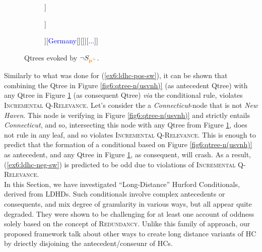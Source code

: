 \begin{figure}[H]
	\centering
	\begin{subfigure}[b]{.35\linewidth}
		\centering
		\begin{forest}
			[CS[{\textcolor{orange}{Connecticut}}][\fbox{\textcolor{orange}{$\neg$Connecticut}}]]
		\end{forest}
	\end{subfigure}	
	\begin{subfigure}[b]{.35\linewidth}
		\centering
		\begin{forest}
			[CS[\textcolor{orange}{Connecticut}][\fbox{\textcolor{orange}{Lower Saxony}}][\fbox{\textcolor{orange}{...}}]]
		\end{forest}
	\end{subfigure}
	\begin{subfigure}[b]{.35\linewidth}
		\centering
		\begin{forest}
			[CS[\textcolor{blue}{US}[\textcolor{orange}{Connecticut}][\fbox{\textcolor{orange}{...}}]][\textcolor{blue}{Germany}[\fbox{\textcolor{orange}{Lower Saxony}}][\fbox{\textcolor{orange}{...}}]][\textcolor{blue}{...}]]
		\end{forest}
	\end{subfigure}	
	\caption[]{Qtrees evoked by $\neg S_{\textbf{\textcolor{orange}{p$^+$}}}$.}\label{fig6:qtrees-nct}
\end{figure}


Similarly to what was done for (\ref{ex6:ldhc-pos-sw}), it can be shown that combining the Qtree in Figure \ref{fig6:qtree-n(usvnh)} (as antecedent Qtree) with any Qtree in Figure \ref{fig6:qtrees-nct} (as consequent Qtree) \textit{via} the conditional rule, violates \textsc{Incremental Q-Relevance}. Let's consider the a \textit{Connecticut}-node that is not \textit{New Haven}. This node is verifying in Figure \ref{fig6:qtree-n(usvnh)} and strictly entails \textit{Connecticut}, and so, intersecting this node with any Qtree from Figure \ref{fig6:qtrees-nct}, does not rule in any leaf, and so violates \textsc{Incremental Q-Relevance}. This is enough to predict that the formation of a conditional based on Figure \ref{fig6:qtree-n(usvnh)} as antecedent, and any Qtree in Figure \ref{fig6:qtrees-nct}, as consequent, will crash. As a result, (\ref{ex6:ldhc-neg-sw}) is predicted to be odd due to violations of \textsc{Incremental Q-Relevance}.\\

In this Section, we have investigated ``Long-Distance'' Hurford Conditionals, derived from LDHDs. Such conditionals involve complex antecedents or consequents, and mix degree of granularity in various ways, but all appear quite degraded. They were shown to be challenging for at least one account of oddness solely based on the concept of \textsc{Redundancy}. Unlike this family of approach, our proposed framework 
talk about other ways to create long distance variants of HC by driectly disjoining the antecedent/conseunr of HCs.




